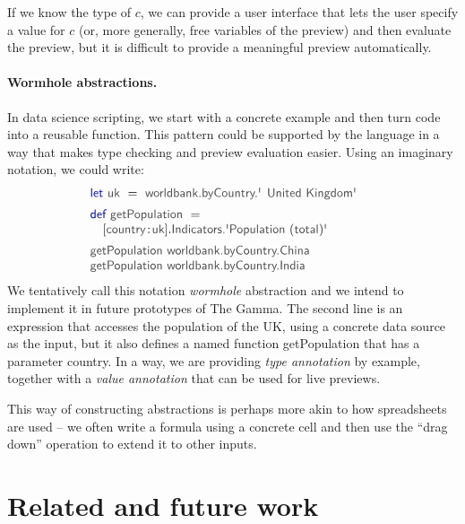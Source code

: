 \documentclass[acmsmall,anonymous,fleqn]{acmart}\settopmatter{printfolios=false,printccs=false,printacmref=false}
\theoremstyle{plain}
\theoremstyle{definition}
\newcommand{\ident}[1]{\textnormal{\textcolor{idclr}{\sffamily #1}}}
\newcommand{\kvd}[1]{\textnormal{\textcolor{kvdclr}{\sffamily #1}}}
\begin{document}
If we know the type of $c$, we can provide a user interface that lets the user specify a value
for $c$ (or, more generally, free variables of the preview) and then evaluate the preview, but
it is difficult to provide a meaningful preview automatically.

\paragraph{Wormhole abstractions.}
In data science scripting, we start with a concrete example and then turn code into a reusable
function. This pattern could be supported by the language in a way that makes type checking
and preview evaluation easier. Using an imaginary notation, we could write:
%
\begin{equation*}
\begin{array}{l}
\kvd{let}~\ident{uk}~=~\ident{worldbank.byCountry.\textquotesingle United Kingdom\textquotesingle}\hspace{1.5em}\\[0.5em]
\kvd{def}~\ident{getPopulation}~=\\
\quad\lbrack\ident{country}\!:\!\ident{uk}\rbrack.\ident{Indicators.\textquotesingle Population (total)\textquotesingle}\\[0.5em]
\ident{getPopulation}~\ident{worldbank.byCountry.China}\\
\ident{getPopulation}~\ident{worldbank.byCountry.India}
\end{array}
\end{equation*}
%
We tentatively call this notation \emph{wormhole} abstraction and we intend to implement it in future prototypes of The Gamma.
The second line is an expression that accesses the population of the UK, using a concrete
data source as the input, but it also defines a named function \ident{getPopulation} that has a
parameter \ident{country}. In a way, we are providing \emph{type annotation} by example, together
with a \emph{value annotation} that can be used for live previews.

This way of constructing abstractions is perhaps more akin to how spreadsheets are used -- we often
write a formula using a concrete cell and then use the ``drag down'' operation to extend it to
other inputs.


\section{Related and future work}
\label{sec:future}
\end{document}
